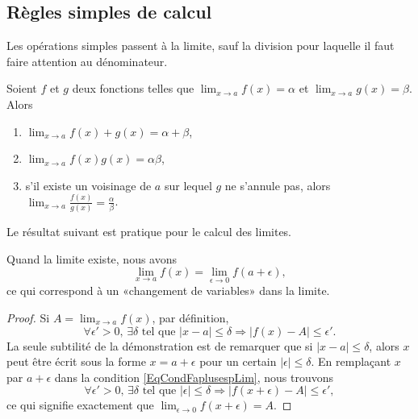 
\subsection{Règles simples de calcul}

Les opérations simples passent à la limite, sauf la division pour laquelle il faut faire attention au dénominateur.
\begin{proposition}     \label{PropOpsSimplesLimites}
    Soient \( f\) et \( g\) deux fonctions telles que \( \lim_{x\to a} f(x)=\alpha\) et \( \lim_{x\to a} g(x)=\beta\). Alors
    \begin{enumerate}
        \item
            \( \lim_{x\to a} f(x)+g(x)=\alpha+\beta\),
        \item
            \( \lim_{x\to a} f(x)g(x)=\alpha\beta\),
        \item
            s'il existe un voisinage de \( a\) sur lequel \( g\) ne s'annule pas, alors \( \lim_{x\to a} \frac{ f(x) }{ g(x) }=\frac{ \alpha }{ \beta }\).
    \end{enumerate}
\end{proposition}

Le résultat suivant est pratique pour le calcul des limites.
\begin{proposition}     \label{PropChmVarLim}
Quand la limite existe, nous avons
\[ 
  \lim_{x\to a}f(x)=\lim_{\epsilon\to 0}f(a+\epsilon),
\]
ce qui correspond à un «changement de variables» dans la limite.
\end{proposition}

\begin{proof}
Si $A=\lim_{x\to a}f(x)$, par définition,
\begin{equation}        \label{EqCondFaplusespLim}
\forall\epsilon'>0,\,\exists\delta\text{ tel que }| x-a |\leq\delta\Rightarrow| f(x)-A |\leq\epsilon'.
\end{equation}
La seule subtilité de la démonstration est de remarquer que si $| x-a |\leq\delta$, alors $x$ peut être écrit sous la forme $x=a+\epsilon$ pour un certain $| \epsilon |\leq\delta$. En remplaçant $x$ par $a+\epsilon$ dans la condition \ref{EqCondFaplusespLim}, nous trouvons 
\begin{equation}
\forall\epsilon'>0,\,\exists\delta\text{ tel que }| \epsilon |\leq\delta\Rightarrow| f(x+\epsilon)-A |\leq\epsilon',
\end{equation}
ce qui signifie exactement que $\lim_{\epsilon\to 0}f(x+\epsilon)=A$.   
\end{proof}

